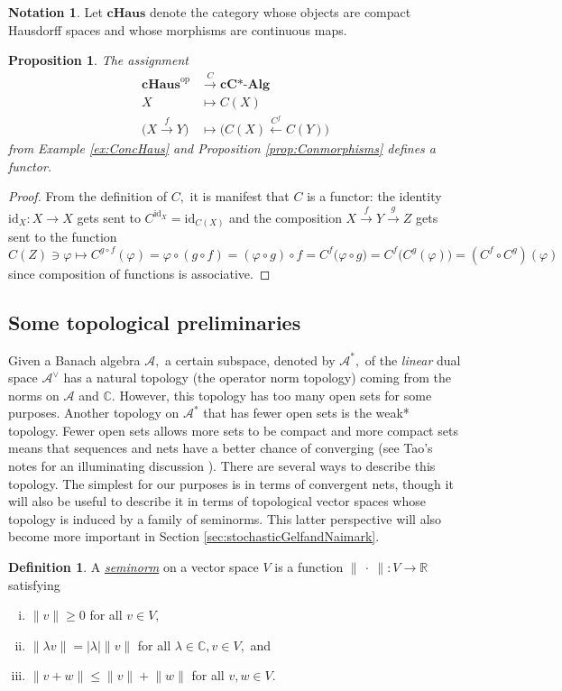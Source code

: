 \documentclass[12pt]{article}
\theoremstyle{theorem}
\newtheorem{proposition}[equation]{Proposition}
\theoremstyle{definition}
\newtheorem{definition}[equation]{Definition}
\newtheorem{notation}[equation]{Notation}
\numberwithin{equation}{section}
\let\l=\lambda \let\r=\rho
\let\C=\Chi \let\W=\Omega
\def\vf{\varphi}
\newcommand{\be}{\begin{equation}}
\newcommand{\ee}{\end{equation}}
\newcommand{\bn}{\begin{proposition}}
\newcommand{\en}{\end{proposition}}
\newcommand{\bd}{\begin{definition}}
\newcommand{\ed}{\end{definition}}
\newcommand{\bprf}{\begin{proof}}
\newcommand{\eprf}{\end{proof}}
\newcommand{\<}{\langle}
\renewcommand{\>}{\rangle}
\newcommand{\id}{\mathrm{id}}
\def\R{{{\mathbb R}}}
\def\C{{{\mathbb C}}}
\newcommand{\cCAlg}{\mathbf{cC\text{*-}Alg}}
\def\mA{{{\mathcal{A}}}}
\newcommand{\op}{\mathrm{op}}
\newcommand{\cH}{\mathbf{cHaus}}
\begin{document}
\begin{notation}
\label{not:cHaus}
Let $\cH$ denote the category whose objects are compact Hausdorff
spaces and whose morphisms are continuous maps. 
\end{notation}

\bn
\label{prop:cHaustocCAlg}
The assignment
\be
\label{eq:cHaustocCAlg}
\begin{split}
\cH^{\op}&\xrightarrow{C}\cCAlg\\
X&\mapsto C(X)\\
\Big(X\xrightarrow{f}Y\Big)&\mapsto
\Big(C(X)\xleftarrow{C^{f}}C(Y)\Big)
\end{split}
\ee
from Example \ref{ex:ConcHaus} and Proposition \ref{prop:Conmorphisms}
defines a functor.
\en

\bprf
From the definition of $C,$ it is manifest that $C$ is a functor:
the identity $\id_{X}:X\to X$ gets sent to $C^{\id_{X}}=\id_{C(X)}$
and the composition $X\xrightarrow{f}Y\xrightarrow{g}Z$ gets sent 
to the function
\be
C(Z)\ni\vf\mapsto C^{g\circ f}(\vf)=\vf\circ(g\circ f)=(\vf\circ g)\circ f
=C^{f}\big(\vf\circ g\big)
=C^{f}\big(C^{g}(\vf)\big)
=(C^{f}\circ C^{g})(\vf)
\ee
since composition of functions is associative. 
\eprf


\subsection{Some topological preliminaries}
\label{sec:topologicalpreliminaries}

Given a Banach algebra $\mA,$ a certain subspace, denoted by $\mA^{*},$ of
the \emph{linear} dual space $\mA^{\vee}$
has a natural topology (the operator norm topology) 
coming from the norms on $\mA$ and $\C.$
However, this topology has too many open sets for some purposes. 
Another topology on $\mA^{*}$ that has fewer open sets is the weak* topology.
Fewer open sets allows more sets to be compact and more compact
sets means that sequences and nets have a better chance of
converging (see Tao's notes for an illuminating discussion \cite{Ta09_245B11}). 
There are several ways to describe this topology. The simplest for our purposes 
is in terms of convergent nets, though it will
also be useful to describe it in terms of topological
vector spaces whose topology is induced by a family of seminorms.
This latter perspective will also become more important in Section
\ref{sec:stochasticGelfandNaimark}.

\bd
A \emph{\uline{seminorm}} on a
vector space $V$ is a function 
$\lVert\ \cdot \ \rVert:V\to\R$ satisfying
\begin{enumerate}[i.]
\setlength{\itemsep}{0pt}
\item
$\lVert v\rVert\ge0$ for all $v\in V,$
\item
$\lVert \l v\rVert=|\l|\lVert v\rVert$ for all 
$\l\in\C,v\in V,$ and
\item
$\lVert v+w\rVert\le\lVert v\rVert+\lVert w\rVert$
for all $v,w\in V.$ 
\end{enumerate}
\ed
\end{document}
